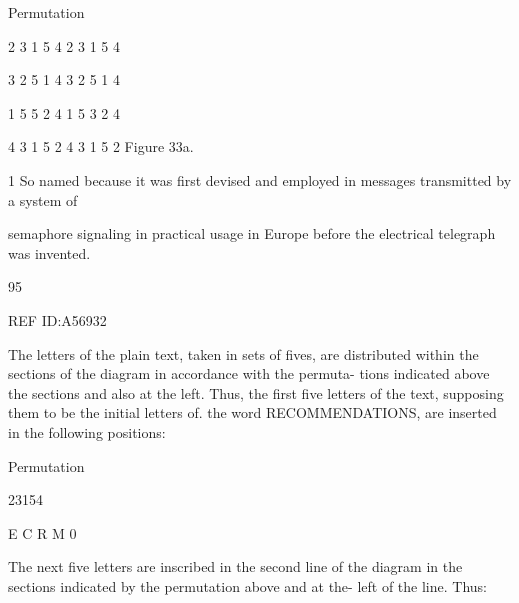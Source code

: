 { 

 

 

 

 

 

 

 

 

 

 

 

 

 

 

Permutation

2 3 1 5 4 2 3 1 5 4

3 2 5 1 4 3 2 5 1 4

1 5 5 2 4 1 5 3 2 4

4 3 1 5 2 4 3 1 5 2
Figure 33a.

1 So named because it was ﬁrst devised and employed in messages transmitted by a system of

semaphore signaling in practical usage in Europe before the electrical telegraph was invented.

95

 

 

 

 

REF ID:A56932

The letters of the plain text, taken in sets of ﬁves, are distributed
within the sections of the diagram in accordance with the permuta-
tions indicated above the sections and also at the left. Thus, the ﬁrst
ﬁve letters of the text, supposing them to be the initial letters of. the
word RECOMMENDATIONS, are inserted in the following positions:

Permutation

 

 

23154

 

 

 

 

 

 

E C R M 0

 

The next ﬁve letters are inscribed in the second line of the diagram
in the sections indicated by the permutation above and at the- left of
the line. Thus:

}
